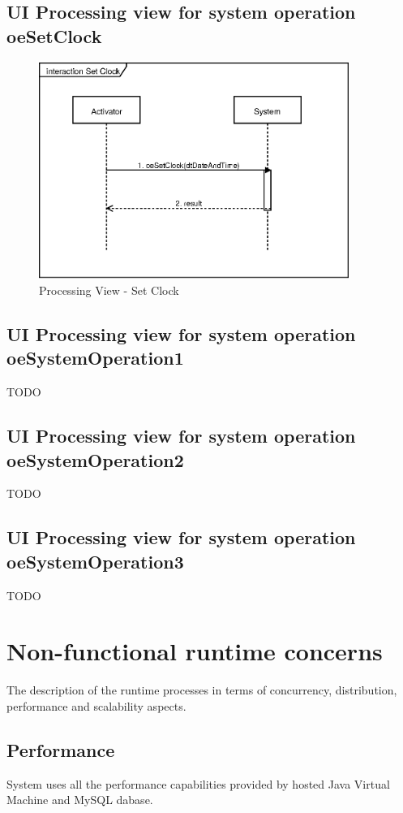 \subsection{UI Processing view for system operation oeSetClock}
\begin{figure}[h!]
	\centering
	\includegraphics[width=0.9\textwidth]{./images/architecture/processing_view/set_clock.eps}
	\caption{Processing View - Set Clock}
\end{figure}


\subsection{UI Processing view for system operation oeSystemOperation1}
TODO

 
\subsection{UI Processing view for system operation oeSystemOperation2}
TODO


\subsection{UI Processing view for system operation oeSystemOperation3}
TODO





\section{Non-functional runtime concerns}
The description of the runtime processes in terms of concurrency, distribution,
performance and scalability aspects.

\subsection{Performance}
System uses all the performance capabilities provided by hosted Java Virtual
Machine and MySQL dabase.

